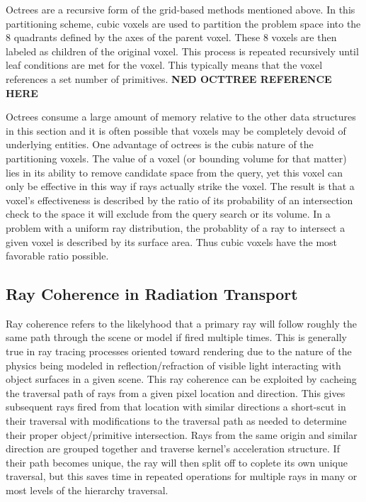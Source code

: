 \documentclass[12pt, a4paper]{article}
\begin{document}
Octrees are a recursive form of the grid-based methods mentioned above. In this partitioning scheme, cubic voxels are used to partition the problem space into the 8 quadrants defined by the axes of the parent voxel. These 8 voxels are then labeled as children of the original voxel. This process is repeated recursively until leaf conditions are met for the voxel. This typically means that the voxel references a set number of primitives. \textbf{NED OCTTREE REFERENCE HERE}

Octrees consume a large amount of memory relative to the other data structures in this section and  it is often possible that voxels may be completely devoid of underlying entities. One advantage of octrees is the cubis nature of the partitioning voxels. The value of a voxel (or bounding volume for that matter) lies in its ability to remove candidate space from the query, yet this voxel can only be effective in this way if rays actually strike the voxel. The result is that a voxel's effectiveness is described by the ratio of its probability of an intersection check to the space it will exclude from the query search or its volume. In a problem with a uniform ray distribution, the probablity of a ray to intersect a given voxel is described by its surface area. Thus cubic voxels have the most favorable ratio possible.

\subsection{Ray Coherence in Radiation Transport}%

Ray coherence refers to the likelyhood that a primary ray will follow roughly the same path through the scene or model if fired multiple times. This is generally true in ray tracing processes oriented toward rendering due to the nature of the physics being modeled in reflection/refraction of visible light interacting with object surfaces in a given scene. This ray coherence can be exploited by cacheing the traversal path of rays from a given pixel location and direction. This gives subsequent rays fired from that location with similar directions a short-scut in their traversal with modifications to the traversal path as needed to determine their proper object/primitive intersection. Rays from the same origin and similar direction are grouped together and traverse kernel's acceleration structure. If their path becomes unique, the ray will then split off to coplete its own unique traversal, but this saves time in repeated operations for multiple rays in many or most levels of the hierarchy traversal.
\end{document}
